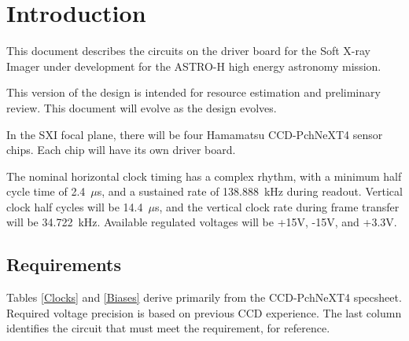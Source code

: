 \section{Introduction}
This document describes the circuits on the driver board for the Soft X-ray Imager under development for the ASTRO-H high energy astronomy mission.

This version of the design is intended for resource estimation and preliminary review. This document will evolve as the design evolves.

In the SXI focal plane, there will be four Hamamatsu CCD-PchNeXT4 sensor chips. Each chip will have its own driver board. 

The nominal horizontal clock timing has a complex rhythm, with a minimum half cycle time of 2.4\ $\mu$s, and a sustained rate of 138.888\ kHz during readout. Vertical clock half cycles will be 14.4\ $\mu$s, and the vertical clock rate during frame transfer will be 34.722\ kHz. Available regulated voltages will be +15V, -15V, and +3.3V. 


\subsection{Requirements}
Tables \ref{Clocks} and \ref{Biases} derive primarily from the CCD-PchNeXT4 specsheet. Required voltage precision is based on previous CCD experience. The last column identifies the circuit that must meet the requirement, for reference.

